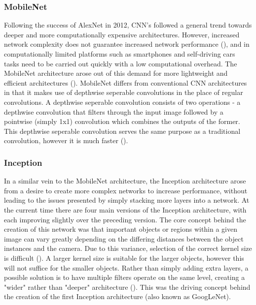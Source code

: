 \documentclass[12pt]{report}
\begin{document}
\subsubsection*{MobileNet}
\begin{flushleft}
Following the success of AlexNet in 2012, CNN's followed a general trend towards deeper and more computationally expensive architectures. However, increased network complexity does not guarantee increased network performance (\cite{szegedy2016rethinking}), and in computationally limited platforms such as smartphones and self-driving cars tasks need to be carried out quickly with a low computational overhead. The MobileNet architecture arose out of this demand for more lightweight and efficient architectures (\cite{howard2017mobilenets}). MobileNet differs from conventional CNN architectures in that it makes use of depthwise seperable convolutions in the place of regular convolutions. A depthwise seperable convolution consists of two operations - a depthwise convolution that filters through the input image followed by a pointwise (simply 1x1) convolution which combines the outputs of the former. This depthwise seperable convolution serves the same purpose as a traditional convolution, however it is much faster (\cite{howard2017mobilenets}).
\end{flushleft}

\subsubsection*{Inception}
\begin{flushleft}
In a similar vein to the MobileNet architecture, the Inception architecture arose from a desire to create more complex networks to increase performance, without leading to the issues presented by simply stacking more layers into a  network. At the current time there are four main versions of the Inception architecture, with each improving slightly over the preceding version. The core concept behind the creation of this network was that important objects or regions within a given image can vary greatly depending on the differing distances between the object instances and the camera. Due to this variance, selection of the correct kernel size is difficult (\cite{szegedy2016rethinking}). A larger kernel size is suitable for the larger objects, however this will not suffice for the smaller objects. Rather than simply adding extra layers, a possible solution is to have multiple filters operate on the same level, creating a "wider" rather than "deeper" architecture (\cite{szegedy2016rethinking}). This was the driving concept behind the creation of the first Inception architecture (also known as GoogLeNet).
\end{flushleft}
\end{document}

